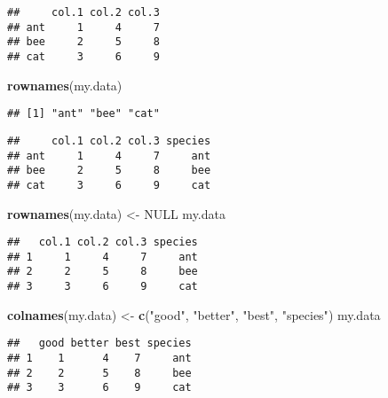 \documentclass[]{book}
\newenvironment{Shaded}{\begin{snugshade}}{\end{snugshade}}
\newcommand{\KeywordTok}[1]{\textcolor[rgb]{0.13,0.29,0.53}{\textbf{#1}}}
\newcommand{\NormalTok}[1]{#1}
\newcommand{\OperatorTok}[1]{\textcolor[rgb]{0.81,0.36,0.00}{\textbf{#1}}}
\newcommand{\OtherTok}[1]{\textcolor[rgb]{0.56,0.35,0.01}{#1}}
\newcommand{\StringTok}[1]{\textcolor[rgb]{0.31,0.60,0.02}{#1}}
\begin{document}
\begin{verbatim}
##     col.1 col.2 col.3
## ant     1     4     7
## bee     2     5     8
## cat     3     6     9
\end{verbatim}

\begin{Shaded}
\begin{Highlighting}[]
\KeywordTok{rownames}\NormalTok{(my.data)}
\end{Highlighting}
\end{Shaded}

\begin{verbatim}
## [1] "ant" "bee" "cat"
\end{verbatim}

\begin{Shaded}
\end{Shaded}

\begin{verbatim}
##     col.1 col.2 col.3 species
## ant     1     4     7     ant
## bee     2     5     8     bee
## cat     3     6     9     cat
\end{verbatim}

\begin{Shaded}
\begin{Highlighting}[]
\KeywordTok{rownames}\NormalTok{(my.data) <-}\StringTok{ }\OtherTok{NULL}
\NormalTok{my.data}
\end{Highlighting}
\end{Shaded}

\begin{verbatim}
##   col.1 col.2 col.3 species
## 1     1     4     7     ant
## 2     2     5     8     bee
## 3     3     6     9     cat
\end{verbatim}

\begin{Shaded}
\begin{Highlighting}[]
\KeywordTok{colnames}\NormalTok{(my.data) <-}\StringTok{ }\KeywordTok{c}\NormalTok{(}\StringTok{"good"}\NormalTok{, }\StringTok{"better"}\NormalTok{, }\StringTok{"best"}\NormalTok{, }\StringTok{"species"}\NormalTok{)}
\NormalTok{my.data}
\end{Highlighting}
\end{Shaded}

\begin{verbatim}
##   good better best species
## 1    1      4    7     ant
## 2    2      5    8     bee
## 3    3      6    9     cat
\end{verbatim}
\end{document}
